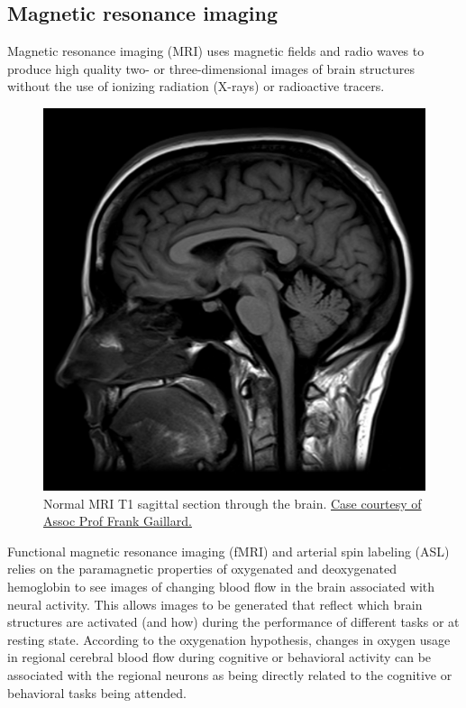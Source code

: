 \hypertarget{magnetic-resonance-imaging}{%
\subsection{Magnetic resonance imaging}\label{magnetic-resonance-imaging}}

Magnetic resonance imaging (MRI) uses magnetic fields and radio waves to produce high quality two- or three-dimensional images of brain structures without the use of ionizing radiation (X-rays) or radioactive tracers.



\begin{figure}

{\centering \includegraphics[width=0.7\linewidth]{./figures/nervoussystem/normal-midline-brain-mri-2} 

}

\caption{Normal MRI T1 sagittal section through the brain. \href{https://radiopaedia.org/cases/2756}{Case courtesy of Assoc Prof Frank Gaillard.}}\label{fig:brainmri}
\end{figure}

Functional magnetic resonance imaging (fMRI) and arterial spin labeling (ASL) relies on the paramagnetic properties of oxygenated and deoxygenated hemoglobin to see images of changing blood flow in the brain associated with neural activity. This allows images to be generated that reflect which brain structures are activated (and how) during the performance of different tasks or at resting state. According to the oxygenation hypothesis, changes in oxygen usage in regional cerebral blood flow during cognitive or behavioral activity can be associated with the regional neurons as being directly related to the cognitive or behavioral tasks being attended.


